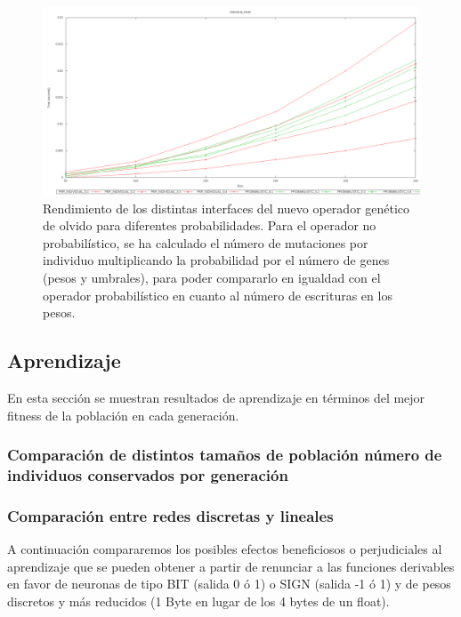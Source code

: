 \documentclass[11pt]{article}
\begin{document}
\begin{titlepage}
\begin{figure}[htb]
\centering
\includegraphics[width=\textwidth]{./img/Individual_reset.png}
\caption{\label{rendGenOlvido}Rendimiento de los distintas interfaces del nuevo operador genético de olvido para diferentes probabilidades. Para el operador no probabilístico, se ha calculado el número de mutaciones por individuo multiplicando la probabilidad por el número de genes (pesos y umbrales), para poder compararlo en igualdad con el operador probabilístico en cuanto al número de escrituras en los pesos.}
\end{figure}
\newpage
\subsection{Aprendizaje}
\label{sec-6-2}

  \label{aprendizaje}

En esta sección se muestran resultados de aprendizaje en términos del mejor fitness de la población en cada generación.
\subsubsection{Comparación de distintos tamaños de población número de individuos conservados por generación}
\label{sec-6-2-1}

   \label{}

\newpage
\subsubsection{Comparaci\'on entre redes discretas y lineales}
\label{sec-6-2-2}

   \label{}

A continuación compararemos los posibles efectos beneficiosos o perjudiciales al aprendizaje que se pueden obtener a partir de renunciar a las funciones derivables en favor de neuronas de tipo BIT (salida 0 ó 1)  o SIGN (salida -1 ó 1) y de pesos discretos y más reducidos (1 Byte en lugar de los 4 bytes de un float).

\end{titlepage}
\end{document}
